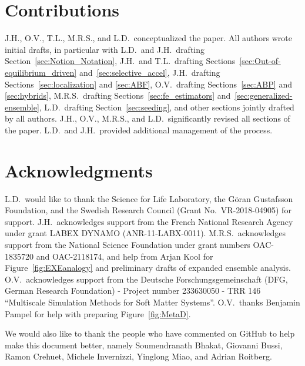\documentclass[9pt,review]{livecoms}
\begin{document}
\section*{Contributions}
J.H., O.V., T.L., M.R.S., and L.D.\ conceptualized the paper. All authors wrote initial drafts, in particular with L.D.\ and J.H.\ drafting Section~\ref{sec:Notion_Notation}, J.H.\ and T.L.\ drafting Sections~\ref{sec:Out-of-equilibrium_driven} and~\ref{sec:selective_accel}, J.H.\ drafting Sections~\ref{sec:localization} and \ref{sec:ABF}, O.V.\ drafting Sections~\ref{sec:ABP} and \ref{sec:hybrids}, M.R.S.\ drafting Sections~\ref{sec:fe_estimators} and~\ref{sec:generalized-ensemble}, L.D.\ drafting Section~\ref{sec:seeding}, and other sections jointly drafted by all authors. J.H., O.V., M.R.S., and L.D.\ significantly revised all sections of the paper. L.D.\ and J.H.\ provided additional management of the process.

\section*{Acknowledgments}
L.D.\ would like to thank the Science for Life Laboratory, the Göran Gustafsson Foundation, and the Swedish Research Council (Grant No.~VR-2018-04905) for support.
J.H.\ acknowledges support from the French National Research Agency under grant LABEX DYNAMO (ANR-11-LABX-0011).
M.R.S.\ acknowledges support from the National Science Foundation under grant numbers OAC-1835720 and OAC-2118174, and help from Arjan Kool for Figure~\ref{fig:EXEanalogy} and preliminary drafts of expanded ensemble analysis.
O.V.\ acknowledges support from the Deutsche Forschungsgemeinschaft (DFG, German Research Foundation) - Project number 233630050 - TRR 146 ``Multiscale Simulation Methods for Soft Matter Systems''.
O.V.\ thanks Benjamin Pampel for help with preparing Figure~\ref{fig:MetaD}.

We would also like to thank the people who have commented on GitHub to help make this document better, namely Soumendranath Bhakat, Giovanni Bussi, Ramon Crehuet, Michele Invernizzi, Yinglong Miao, and Adrian Roitberg.

\makeorcid




\appendix
\end{document}
